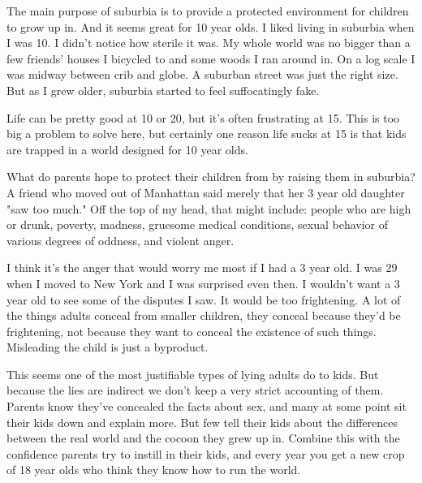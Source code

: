 The
                  main purpose of suburbia is to provide a protected environment
                  for children to grow up in. And it seems great for 10 year
                  olds. I liked living in suburbia when I was 10. I didn't
                  notice how sterile it was. My whole world was no bigger than a
                  few friends' houses I bicycled to and some woods I ran around
                  in. On a log scale I was midway between crib and globe. A
                  suburban street was just the right size. But as I grew older,
                  suburbia started to feel suffocatingly fake.

Life
                  can be pretty good at 10 or 20, but it's often frustrating at
                  15. This is too big a problem to solve here, but certainly one
                  reason life sucks at 15 is that kids are trapped in a world
                  designed for 10 year olds.

What do parents hope to
                  protect their children from by raising them in suburbia? A
                  friend who moved out of Manhattan said merely that her 3 year
                  old daughter "saw too much." Off the top of my head, that
                  might include: people who are high or drunk, poverty, madness,
                  gruesome medical conditions, sexual behavior of various
                  degrees of oddness, and violent anger.

I think it's
                  the anger that would worry me most if I had a 3 year old. I
                  was 29 when I moved to New York and I was surprised even then.
                  I wouldn't want a 3 year old to see some of the disputes I
                  saw. It would be too frightening. A lot of the things adults
                  conceal from smaller children, they conceal because they'd be
                  frightening, not because they want to conceal the existence of
                  such things. Misleading the child is just a byproduct.

This
                  seems one of the most justifiable types of lying adults do to
                  kids. But because the lies are indirect we don't keep a very
                  strict accounting of them. Parents know they've concealed the
                  facts about sex, and many at some point sit their kids down
                  and explain more. But few tell their kids about the
                  differences between the real world and the cocoon they grew up
                  in. Combine this with the confidence parents try to instill in
                  their kids, and every year you get a new crop of 18 year olds
                  who think they know how to run the world.

